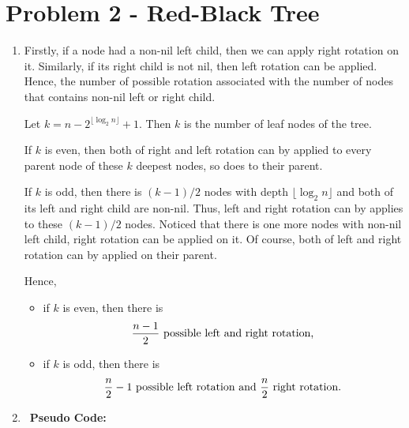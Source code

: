 \documentclass[12pt,a4paper,titlepage,AutoFakeBold]{article}
\begin{document}
\section*{Problem 2 - Red-Black Tree}
\begin{enumerate}[label=\arabic*.,topsep=0pt]
    \item Firstly, if a node had a non-nil left child, then we can apply right rotation on it. Similarly, if its right child is not nil, then left rotation can be applied. Hence, the number of possible rotation associated with the number of nodes that contains non-nil left or right child. 
    
    Let $k = n - 2^{\lfloor\log_2 n\rfloor}+1$. Then $k$ is the number of leaf nodes of the tree.
    
    If $k$ is even, then both of right and left rotation can by applied to every parent node of these $k$ deepest nodes, so does to their parent.

    If $k$ is odd, then there is $(k - 1)/2$ nodes with depth $\lfloor\log_2 n\rfloor$ and both of its left and right child are non-nil. Thus, left and right rotation can by applies to these $(k - 1)/2$ nodes. Noticed that there is one more nodes with non-nil left child, right rotation can be applied on it. Of course, both of left and right rotation can by applied on their parent.

    Hence,
    \begin{itemize}[noitemsep,topsep=0pt]
        \item if $k$ is even, then there is 
        \[
            \frac{n - 1}{2} \textup{ possible left and right rotation,}
        \]
        \item if $k$ is odd, then there is 
        \[
            \frac{n}{2} - 1\textup{ possible left rotation and }\frac{n}{2} \textup{ right rotation.}
        \]
    \end{itemize}
    \item\ 
    \textbf{Pseudo Code:}

    \vspace{-6mm}
    \hspace{24pt}\begin{minipage}[t]{\linewidth}
        \begin{algorithm}[H]
            \DontPrintSemicolon
            

\end{algorithm}
\end{minipage}
\end{enumerate}
\end{document}
